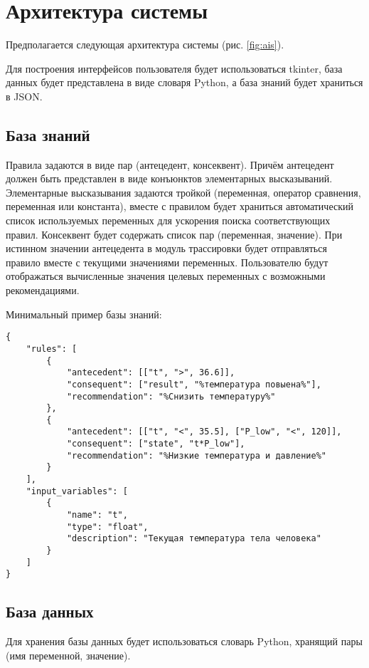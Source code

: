 \section{Архитектура системы}

Предполагается следующая архитектура системы (рис. \ref{fig:ais}).


Для построения интерфейсов пользователя будет использоваться tkinter, база данных будет представлена в виде словаря Python, а база знаний будет храниться в JSON.

\subsection{База знаний}

Правила задаются в виде пар (антецедент, консеквент).
Причём антецедент должен быть представлен в виде конъюнктов элементарных высказываний.
Элементарные высказывания задаются тройкой (переменная, оператор сравнения, переменная или константа),
вместе с правилом будет храниться автоматический список используемых переменных для ускорения поиска соответствующих правил.
Консеквент будет содержать список пар (переменная, значение).
При истинном значении антецедента в модуль трассировки будет отправляться правило вместе с текущими значениями переменных.
Пользователю будут отображаться вычисленные значения целевых переменных с возможными рекомендациями.

Минимальный пример базы знаний:


\begin{lstlisting}
{
	"rules": [
		{
			"antecedent": [["t", ">", 36.6]],
			"consequent": ["result", "%температура повыена%"],
			"recommendation": "%Снизить температуру%"
		},
		{
			"antecedent": [["t", "<", 35.5], ["P_low", "<", 120]],
			"consequent": ["state", "t*P_low"],
			"recommendation": "%Низкие температура и давление%"
		}
	],
	"input_variables": [
		{
			"name": "t",
			"type": "float",
			"description": "Текущая температура тела человека"
		}
	]
}
\end{lstlisting}

\subsection{База данных}

Для хранения базы данных будет использоваться словарь Python, хранящий пары (имя переменной, значение).

